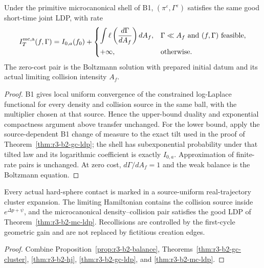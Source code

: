 \begin{theorem}
\label{thm:r3-b2-mc-ldp}
Under the primitive microcanonical shell of B1,
\((\pi^\varepsilon,\Gamma^\varepsilon)\) satisfies the same good short-time
joint LDP, with rate
\[
 I_T^{\rm mc,a}(f,\Gamma)
 =I_{0,a}(f_0)
 +\begin{cases}
 \displaystyle\int
 \ell\left(\frac{d\Gamma}{dA_f}\right)dA_f,
 &\Gamma\ll A_f\text{ and }(f,\Gamma)\text{ feasible},\\[2ex]
 +\infty,&\text{otherwise}.
 \end{cases}
\]
The zero-cost pair is the Boltzmann solution with prepared initial datum and
its actual limiting collision intensity \(A_f\).
\end{theorem}

\begin{proof}
B1 gives local uniform convergence of the constrained log-Laplace functional
for every density and collision source in the same ball, with the multiplier
chosen at that source.  Hence the upper-bound duality and exponential
compactness argument above transfer unchanged.  For the lower bound, apply the
source-dependent B1 change of measure to the exact tilt used in the proof of
Theorem~\ref{thm:r3-b2-gc-ldp}; the shell has subexponential probability under
that tilted law and its logarithmic coefficient is exactly \(I_{0,a}\).
Approximation of finite-rate pairs is unchanged.  At zero cost,
\(d\Gamma/dA_f=1\) and the weak balance is the Boltzmann equation.
\end{proof}

\begin{theorem}
\label{thm:r3-b2-main}
Every actual hard-sphere contact is marked in a source-uniform real-trajectory
cluster expansion.  The limiting Hamiltonian contains the collision source
inside \(e^{\Delta p+\psi}\), and the microcanonical density--collision pair
satisfies the good LDP of Theorem~\ref{thm:r3-b2-mc-ldp}.  Recollisions are
controlled by the first-cycle geometric gain and are not replaced by fictitious
creation edges.
\end{theorem}

\begin{proof}
Combine Proposition~\ref{prop:r3-b2-balance},
Theorems~\ref{thm:r3-b2-gc-cluster}, \ref{thm:r3-b2-hj},
\ref{thm:r3-b2-gc-ldp}, and \ref{thm:r3-b2-mc-ldp}.
\end{proof}

